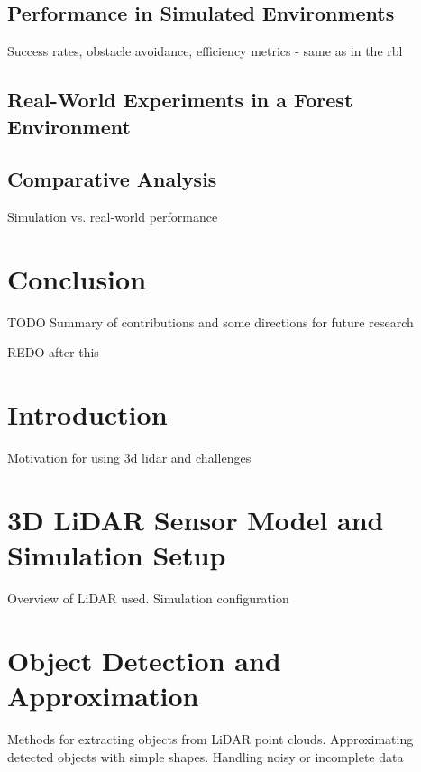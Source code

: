        \subsection{Performance in Simulated Environments}
            Success rates, obstacle avoidance, efficiency metrics - same as in the rbl
        \subsection{Real-World Experiments in a Forest Environment}
        \subsection{Comparative Analysis}
            Simulation vs. real-world performance
    
    \section{Conclusion}
        TODO
        Summary of contributions and some directions for future research
    






















REDO after this

\section{Introduction}

Motivation for using 3d lidar and challenges

\section{3D LiDAR Sensor Model and Simulation Setup}

Overview of LiDAR used. Simulation configuration

\section{Object Detection and Approximation}

Methods for extracting objects from LiDAR point clouds. Approximating detected objects with simple shapes. Handling noisy or incomplete data

